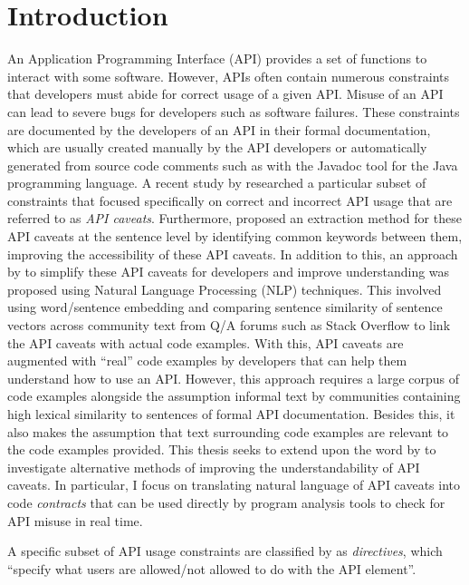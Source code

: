 \chapter{Introduction}
\label{cha:intro}

An Application Programming Interface (API) provides a set of functions to interact with some software. However, APIs often contain numerous constraints that developers must abide for correct usage of a given API. Misuse of an API can lead to severe bugs for developers such as software failures. These constraints are documented by the developers of an API in their formal documentation, which are usually created manually by the API developers or automatically generated from source code comments such as with the Javadoc tool for the Java programming language. A recent study by \citeauthor{caveat-knowledge-graph} researched a particular subset of constraints that focused specifically on correct and incorrect API usage that are referred to as \textit{API caveats}. Furthermore, \citeauthor{caveat-knowledge-graph} proposed an extraction method for these API caveats at the sentence level by identifying common keywords between them, improving the accessibility of these API caveats. 
In addition to this, an approach by \citeauthor{jiamou} to simplify these API caveats for developers and improve understanding was proposed using Natural Language Processing (NLP) techniques. This involved using word/sentence embedding and comparing sentence similarity of sentence vectors across community text from Q/A forums such as Stack Overflow to link the API caveats with actual code examples. With this, API caveats are augmented with ``real'' code examples by developers that can help them understand how to use an API. However, this approach requires a large corpus of code examples alongside the assumption informal text by communities containing high lexical similarity to sentences of formal API documentation. Besides this, it also makes the assumption that text surrounding code examples are relevant to the code examples provided.
This thesis seeks to extend upon the word by \citeauthor{caveat-knowledge-graph, jiamou, xiaoxue} to investigate alternative methods of improving the understandability of API caveats. In particular, I focus on translating natural language of API caveats into code \textit{contracts} that can be used directly by program analysis tools to check for API misuse in real time.

A specific subset of API usage constraints are classified by \cite{maalej2013patterns} as \textit{directives}, which ``specify what users
are allowed/not allowed to do with the API element''. 

